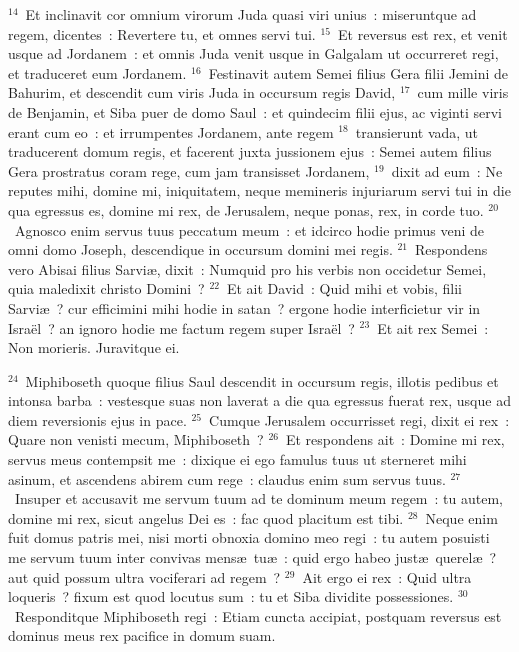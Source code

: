 ${}^{14}$~Et inclinavit cor omnium virorum Juda quasi viri unius~: miseruntque ad regem, dicentes~: Revertere tu, et omnes servi tui.
${}^{15}$~Et reversus est rex, et venit usque ad Jordanem~: et omnis Juda venit usque in Galgalam ut occurreret regi, et traduceret eum Jordanem.
${}^{16}$~Festinavit autem Semei filius Gera filii Jemini de Bahurim, et descendit cum viris Juda in occursum regis David,
${}^{17}$~cum mille viris de Benjamin, et Siba puer de domo Saul~: et quindecim filii ejus, ac viginti servi erant cum eo~: et irrumpentes Jordanem, ante regem
${}^{18}$~transierunt vada, ut traducerent domum regis, et facerent juxta jussionem ejus~: Semei autem filius Gera prostratus coram rege, cum jam transisset Jordanem,
${}^{19}$~dixit ad eum~: Ne reputes mihi, domine mi, iniquitatem, neque memineris injuriarum servi tui in die qua egressus es, domine mi rex, de Jerusalem, neque ponas, rex, in corde tuo.
${}^{20}$~Agnosco enim servus tuus peccatum meum~: et idcirco hodie primus veni de omni domo Joseph, descendique in occursum domini mei regis.
${}^{21}$~Respondens vero Abisai filius Sarvi\ae , dixit~: Numquid pro his verbis non occidetur Semei, quia maledixit christo Domini~?
${}^{22}$~Et ait David~: Quid mihi et vobis, filii Sarvi\ae~? cur efficimini mihi hodie in satan~? ergone hodie interficietur vir in Isra\"el~? an ignoro hodie me factum regem super Isra\"el~?
${}^{23}$~Et ait rex Semei~: Non morieris. Juravitque ei.


${}^{24}$~Miphiboseth quoque filius Saul descendit in occursum regis, illotis pedibus et intonsa barba~: vestesque suas non laverat a die qua egressus fuerat rex, usque ad diem reversionis ejus in pace.
${}^{25}$~Cumque Jerusalem occurrisset regi, dixit ei rex~: Quare non venisti mecum, Miphiboseth~?
${}^{26}$~Et respondens ait~: Domine mi rex, servus meus contempsit me~: dixique ei ego famulus tuus ut sterneret mihi asinum, et ascendens abirem cum rege~: claudus enim sum servus tuus.
${}^{27}$~Insuper et accusavit me servum tuum ad te dominum meum regem~: tu autem, domine mi rex, sicut angelus Dei es~: fac quod placitum est tibi.
${}^{28}$~Neque enim fuit domus patris mei, nisi morti obnoxia domino meo regi~: tu autem posuisti me servum tuum inter convivas mens\ae\ tu\ae~: quid ergo habeo just\ae\ querel\ae~? aut quid possum ultra vociferari ad regem~?
${}^{29}$~Ait ergo ei rex~: Quid ultra loqueris~? fixum est quod locutus sum~: tu et Siba dividite possessiones.
${}^{30}$~Responditque Miphiboseth regi~: Etiam cuncta accipiat, postquam reversus est dominus meus rex pacifice in domum suam.



